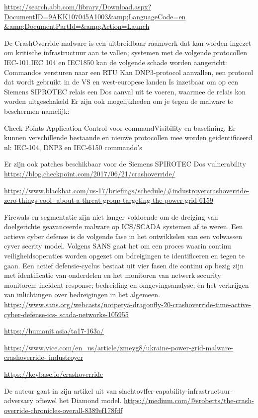 		\url{https://search.abb.com/library/Download.aspx?DocumentID=9AKK107045A1003&amp;LanguageCode=en
			&amp;DocumentPartId=&amp;Action=Launch}
		
		De CrashOverride malware is een uitbreidbaar raamwerk dat kan worden ingezet om kritische
		infrastructuur aan te vallen; systemen met de volgende protocollen IEC-101,IEC 104 en IEC1850 kan
		de volgende schade worden aangericht:
		Commandos versturen naar een RTU
		Kan DNP3-protocol aanvallen, een protocol dat wordt gebruikt in de VS en west-europese
		landen
		Is inzetbaar om op een Siemens SIPROTEC relais een Dos aanval uit te voeren, waarmee de
		relais kon worden uitgeschakeld
		Er zijn ook mogelijkheden om je tegen de malware te beschermen namelijk:
		
		Check Points Application Control voor commandVisibility en baselining. Er kunnen
		verschillende bestaande en nieuwe protocollen mee worden geidentificeerd nl: IEC-104,
		DNP3 en IEC-6150 commando’s
		 
		Er zijn ook patches beschikbaar voor de Siemens SPIROTEC Dos vulnerability
		\url{https://blog.checkpoint.com/2017/06/21/crashoverride/}
		
		\url{https://www.blackhat.com/us-17/briefings/schedule/#industroyercrashoverride-zero-things-cool-
			about-a-threat-group-targeting-the-power-grid-6159}
		
		Firewals en segmentatie zijn niet langer voldoende om de dreiging van doelgerichte geavanceerde
		malware op ICS/SCADA systemen af te weren.
		Een actieve cyber defense is de volgende fase in het ontwikkelen van een volwassen cyver secrity
		model. Volgens SANS gaat het om een proces waarin continu veiligheidsoperaties worden opgezet
		om bdreigingen te identificeren en tegen te gaan. Een actief defensie-cyclus bestaat uit vier fasen die
		continu op bezig zijn met identificatie van onderdelen en het monitoren van netwerk security
		monitoren; incident response; bedreiding en omgevingsanalyse; en het verkrijgen van inlichtingen
		over bedreigingen in het algemeen.
		\url{https://www.sans.org/webcasts/notpetya-dragonfly-20-crashoverride-time-active-cyber-defense-ics-
			scada-networks-105955}
		
		\url{https://humanit.asia/ta17-163a/}
		
		\url{https://www.vice.com/en_us/article/zmeyg8/ukraine-power-grid-malware-crashoverride-
			industroyer}
		
		\url{https://keybase.io/crashoverride}
		
		De auteur gaat in zijn artikel uit van slachtovffer-capability-infrastructuur-adversary oftewel het
		Diamond model.
		\url{https://medium.com/@sroberts/the-crash-override-chronicles-overall-8389ef178fdf}
		
